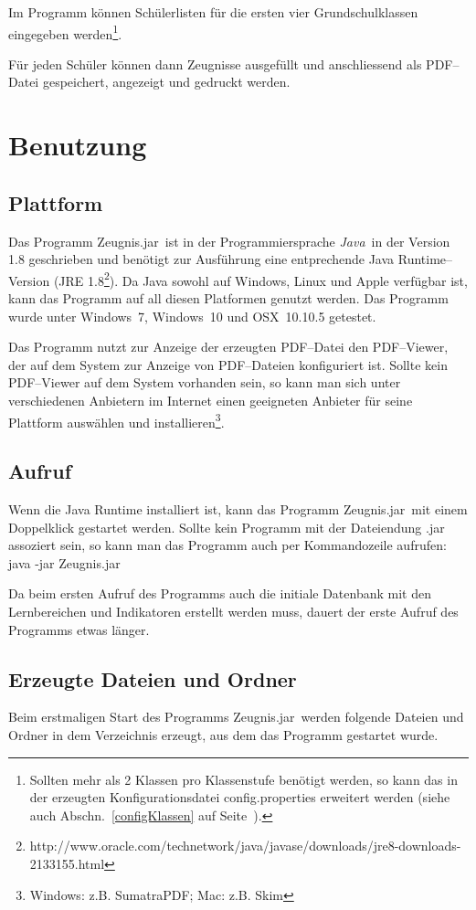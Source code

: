 \documentclass[a4paper,notitlepage,parskip]{scrartcl}
\newcommand{\zjar}{Zeugnis.jar}
\newcommand\ott{\normalfont\ttfamily}
\newcommand\java{{\normalfont\slshape Java}}
\begin{document}
Im Programm können Schülerlisten für die ersten vier Grundschulklassen eingegeben
werden\footnote{Sollten mehr als 2 Klassen pro Klassenstufe benötigt werden, so kann das in der erzeugten Konfigurationsdatei {\ott config.properties} erweitert werden (siehe auch Abschn.~\ref{configKlassen} auf Seite~\pageref{configKlassen}).}.

Für jeden Schüler können dann Zeugnisse ausgefüllt und anschliessend als PDF--Datei gespeichert, angezeigt und gedruckt werden.

\section{Benutzung}
\subsection{Plattform}
Das Programm \zjar\ ist in der Programmiersprache \java\ in der Version 1.8 geschrieben und benötigt zur Ausführung eine entprechende Java Runtime--Version 
(JRE 1.8\footnote{http://www.oracle.com/technetwork/java/javase/downloads/jre8-downloads-2133155.html}).
Da Java sowohl auf Windows, Linux und Apple verfügbar ist, kann das Programm auf all diesen Platformen genutzt werden. Das Programm wurde unter Windows~7, Windows~10 und OSX~10.10.5 getestet.

Das Programm nutzt zur Anzeige der erzeugten PDF--Datei den PDF--Viewer, der auf dem System zur Anzeige von PDF--Dateien konfiguriert ist. Sollte kein PDF--Viewer auf dem System vorhanden sein, so kann man sich unter verschiedenen Anbietern im Internet einen geeigneten Anbieter für seine Plattform auswählen und installieren\footnote{Windows: z.B. SumatraPDF; Mac: z.B. Skim}.

\subsection{Aufruf}
Wenn die Java Runtime installiert ist, kann das Programm \zjar\ mit einem Doppelklick gestartet werden. Sollte kein Programm mit der Dateiendung {\ott .jar} assoziert sein, so kann man das Programm auch per Kommandozeile aufrufen:\\
{\ott java -jar Zeugnis.jar}

Da beim ersten Aufruf des Programms auch die initiale Datenbank mit den Lernbereichen und Indikatoren erstellt werden muss, dauert der erste Aufruf des Programms etwas länger.

\subsection{Erzeugte Dateien und Ordner}
Beim erstmaligen Start des Programms \zjar\ werden folgende Dateien und Ordner in dem Verzeichnis erzeugt, aus dem das Programm gestartet wurde.
\end{document}
